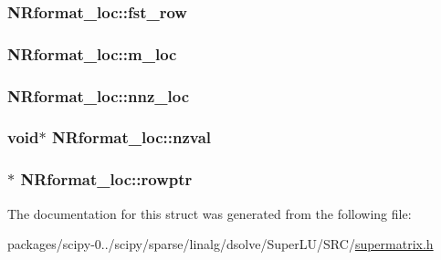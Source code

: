 \subsubsection[{fst\+\_\+row}]{ N\+Rformat\+\_\+loc\+::fst\+\_\+row}\label{structNRformat__loc_acab0ad4c74c4b4f0c68647f98b430cd9}
\hypertarget{structNRformat__loc_a90413dc3eb197a83b70cc0d97e4c54af}{}
\subsubsection[{m\+\_\+loc}]{ N\+Rformat\+\_\+loc\+::m\+\_\+loc}\label{structNRformat__loc_a90413dc3eb197a83b70cc0d97e4c54af}
\hypertarget{structNRformat__loc_a41c309cb83dedeaa82c0e4e137ea4785}{}
\subsubsection[{nnz\+\_\+loc}]{ N\+Rformat\+\_\+loc\+::nnz\+\_\+loc}\label{structNRformat__loc_a41c309cb83dedeaa82c0e4e137ea4785}
\hypertarget{structNRformat__loc_a08b19d74f15e6475f43565035ae898ca}{}
\subsubsection[{nzval}]{\setlength{\rightskip}{0pt plus 5cm}void$\ast$ N\+Rformat\+\_\+loc\+::nzval}\label{structNRformat__loc_a08b19d74f15e6475f43565035ae898ca}
\hypertarget{structNRformat__loc_aadd0788ee704ffb7000b0485ee128061}{}
\subsubsection[{rowptr}]{$\ast$ N\+Rformat\+\_\+loc\+::rowptr}\label{structNRformat__loc_aadd0788ee704ffb7000b0485ee128061}


The documentation for this struct was generated from the following file\+:\begin{DoxyCompactItemize}
\item 
packages/scipy-\/0../scipy/sparse/linalg/dsolve/\+Super\+L\+U/\+S\+R\+C/\hyperlink{supermatrix_8h}{supermatrix.\+h}\end{DoxyCompactItemize}

